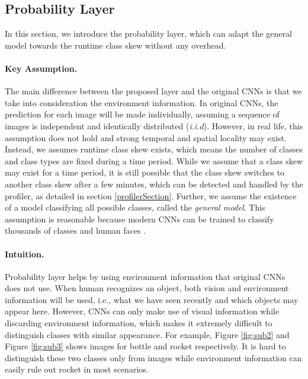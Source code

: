 \documentclass[pageno]{jpaper}
\begin{document}
\subsection{Probability Layer}
In this section, we introduce the probability layer, which can adapt the general model towards the runtime class skew without any overhead.

\paragraph{Key Assumption.} 
The main difference between the proposed layer and the original CNNs is that we take into consideration the environment information. In original CNNs, the prediction for each image will be made individually, assuming a sequence of images is independent and identically distributed (\textit{i.i.d}). However, in real life, this assumption does not hold and strong temporal and spatial locality may exist. Instead, we assumes runtime class skew exists, which means the number of classes and class types are fixed during a time period. While we assume that a class skew may exist for a time period, it is still possible that the class skew switches to another class skew after a few minutes, which can be detected and handled by the profiler, as detailed in section \ref{profilerSection}. Further, we assume the existence of a model classifying all possible classes, called the \textit{general model}. This assumption is reasonable because modern CNNs can be trained to classify thousands of classes \cite{krizhevsky2012imagenet, simonyan2014very, szegedy2015going, he2016deep, huang2017densely} and human faces \cite{parkhi2015deep, schroff2015facenet, taigman2015web}.

\paragraph{Intuition.}
Probability layer helps by using environment information that original CNNs does not use. When human recognizes an object, both vision and environment information will be used, i.e., what we have seen recently and which objects may appear here. However, CNNs can only make use of visual information while discarding environment information, which makes it extremely difficult to distinguish classes with similar appearance. For example, Figure \ref{fig:sub2} and Figure \ref{fig:sub3} shows images for bottle and rocket respectively. It is hard to distinguish these two classes only from images while environment information can easily rule out rocket in most scenarios. 
\end{document}
